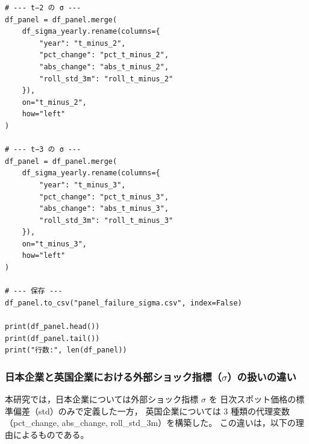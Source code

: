 \begin{verbatim}
# --- t−2 の σ ---
df_panel = df_panel.merge(
    df_sigma_yearly.rename(columns={
        "year": "t_minus_2",
        "pct_change": "pct_t_minus_2",
        "abs_change": "abs_t_minus_2",
        "roll_std_3m": "roll_t_minus_2"
    }),
    on="t_minus_2",
    how="left"
)

# --- t−3 の σ ---
df_panel = df_panel.merge(
    df_sigma_yearly.rename(columns={
        "year": "t_minus_3",
        "pct_change": "pct_t_minus_3",
        "abs_change": "abs_t_minus_3",
        "roll_std_3m": "roll_t_minus_3"
    }),
    on="t_minus_3",
    how="left"
)

# --- 保存 ---
df_panel.to_csv("panel_failure_sigma.csv", index=False)

print(df_panel.head())
print(df_panel.tail())
print("行数:", len(df_panel))

\end{verbatim}

\subsubsection*{日本企業と英国企業における外部ショック指標（$\sigma$）の扱いの違い}

本研究では，日本企業については外部ショック指標 $\sigma$ を
日次スポット価格の標準偏差（std）のみで定義した一方，
英国企業については 3 種類の代理変数（pct\_change, abs\_change, roll\_std\_3m）を構築した。
この違いは，以下の理由によるものである。

